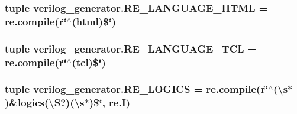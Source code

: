 \hypertarget{namespaceverilog__generator_a9a4484e49b7559533253e1bda0ca0e6c}{
\subsubsection[{R\-E\-\_\-\-L\-A\-N\-G\-U\-A\-G\-E\-\_\-\-H\-T\-M\-L}]{\setlength{\rightskip}{0pt plus 5cm}tuple verilog\-\_\-generator.\-R\-E\-\_\-\-L\-A\-N\-G\-U\-A\-G\-E\-\_\-\-H\-T\-M\-L = re.\-compile(r\char`\"{}$^\wedge$(html)\$\char`\"{})}}\label{namespaceverilog__generator_a9a4484e49b7559533253e1bda0ca0e6c}
\hypertarget{namespaceverilog__generator_a0ca785f35678184fec88d5d43caa3740}{
\subsubsection[{R\-E\-\_\-\-L\-A\-N\-G\-U\-A\-G\-E\-\_\-\-T\-C\-L}]{\setlength{\rightskip}{0pt plus 5cm}tuple verilog\-\_\-generator.\-R\-E\-\_\-\-L\-A\-N\-G\-U\-A\-G\-E\-\_\-\-T\-C\-L = re.\-compile(r\char`\"{}$^\wedge$(tcl)\$\char`\"{})}}\label{namespaceverilog__generator_a0ca785f35678184fec88d5d43caa3740}
\hypertarget{namespaceverilog__generator_a767602e234555709fb8829fe493912ff}{
\subsubsection[{R\-E\-\_\-\-L\-O\-G\-I\-C\-S}]{\setlength{\rightskip}{0pt plus 5cm}tuple verilog\-\_\-generator.\-R\-E\-\_\-\-L\-O\-G\-I\-C\-S = re.\-compile(r\char`\"{}$^\wedge$(\textbackslash{}s$\ast$)\&logics(\textbackslash{}S?)(\textbackslash{}s$\ast$)\$\char`\"{}, re.\-I)}}\label{namespaceverilog__generator_a767602e234555709fb8829fe493912ff}
